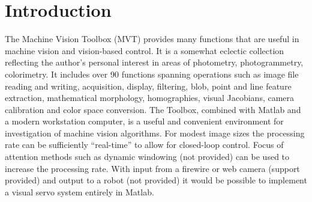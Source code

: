 \documentclass{article}
\begin{document}
{\newcommand{\Mlab}{M\eightTR ATLAB}
\newcommand{\under}[1]{\underline{\rule[-.70ex]{0cm}{4mm}#1}}


{\School

\pagestyle{fancyplain}
\rhead{\rm\thepage}
\lhead{}
\cfoot{}
\setlength{\headrulewidth}{0pt}


\newcommand{\be}{\begin{equation}}
\newcommand{\ee}{\end{equation}}
\newcommand{\bea}{\begin{eqnarray}}
\newcommand{\eea}{\end{eqnarray}}
\newcommand{\bi}{\begin{itemize}}
\newcommand{\ei}{\end{itemize}}
\newcommand{\ii}{\item}


\renewcommand{\baselinestretch}{1.2}        %

\newpage
{}
\vskip 2mm
\moveleft 1.25in\vbox{}
\vskip 5mm

\section{Introduction}
The Machine Vision Toolbox (MVT) provides many 
functions that 
are useful in machine vision and vision-based control.
It is a somewhat eclectic collection reflecting the author's personal interest in
areas of photometry, photogrammetry, colorimetry.
It includes over 90 functions spanning operations such as
image file reading and writing, acquisition, display, filtering,
blob, point and line feature extraction,  mathematical morphology, 
homographies, visual Jacobians,
camera calibration and color space conversion.
The Toolbox, combined with Matlab and a modern workstation computer,
is a useful and convenient environment for investigation of machine
vision algorithms.  For modest image sizes the processing rate can
be sufficiently ``real-time'' to allow for closed-loop control.  Focus of
attention methods such as dynamic windowing (not provided) can be
used to increase the processing rate.
With input from a firewire or web camera (support provided) and 
output to a robot
(not provided) it would be possible to implement a visual servo system
entirely in Matlab.

}}
\end{document}
